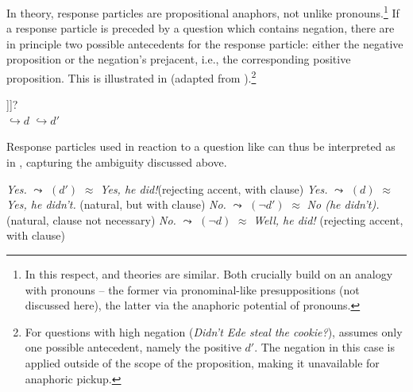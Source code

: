 \documentclass[output=paper,colorlinks,citecolor=brown]{langscibook}
\begin{document}
In  theory, response particles are propositional anaphors, not unlike pronouns.\footnote{In this respect,  and  theories are similar. Both crucially build on an analogy with pronouns -- the former via pronominal-like presuppositions (not discussed here), the latter via the anaphoric potential of pronouns.} If a response particle is preceded by a question which contains negation, there are in principle two possible antecedents for the response particle: either the negative proposition or the negation's prejacent, i.e., the corresponding positive proposition. This is illustrated in  (adapted from \citealt[14]{hrd+:krifka13}).\footnote{For questions with high negation (\textit{Didn't Ede steal the cookie?}), \citet[14]{hrd+:krifka13} assumes only one possible antecedent, namely the positive $d'$. The negation in this case is applied outside of the scope of the proposition, making it unavailable for anaphoric pickup.}

\ea \gll [\textsubscript{ActP} did REQUEST [\textsubscript{NegP} Ede not {[\textsubscript{TP} t\textsubscript{Ede}} t\textsubscript{did} steal the cookie]]]?\label{hrdsim:ex:krifka1}\\
{} {} {} {$\hookrightarrow d$} {} {} {$\hookrightarrow d'$}\\
\z

\noindent Response particles used in reaction to a question like  can thus be interpreted as in , capturing the ambiguity discussed above.

\ea\label{hrdsim:ex:krifka}
\ea \textit{Yes.} $\leadsto$ $(d′)$ $\approx$ \textit{Yes, he did!}\hfill (rejecting accent, with clause)
\ex \textit{Yes.} $\leadsto$ $(d)$ $\approx$ \textit{Yes, he didn't.} \hfill (natural, but with clause)
\ex \textit{No.} $\leadsto$ $(\neg d′)$ $\approx$ \textit{No (he didn’t).} \hfill (natural, clause not necessary)
\ex \textit{No.} $\leadsto$ $(\neg d)$ $\approx$ \textit{Well, he did!} \hfill (rejecting accent, with clause)
\z\z
\end{document}
